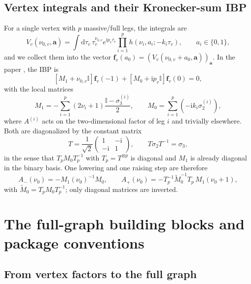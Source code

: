 \documentclass[11pt,a4paper]{article}
\newcommand{\dd}{\mathrm d}
\newcommand{\ii}{\mathrm i}
\newcommand{\Id}{\mathbb I}
\begin{document}
\subsection{Vertex integrals and their Kronecker-sum IBP}

For a single vertex with $p$ massive/full legs, the integrals are
\begin{equation}
  V_v(\nu_{0,v},\bm a)
  =\int\dd\tau_v\,\tau_v^{\nu_{0,v}}e^{\ii p_v\tau_v}
  \prod_{i=1}^{p}h(\nu_i,a_i;-k_i\tau_v),
  \qquad a_i\in\{0,1\},
\end{equation}
and we collect them into the vector $\bm f_v(a_0)=(V_v(\nu_{0,v}+a_0,\bm a))_{\bm a}$. In the paper
\citet{Chen:2023eic}, the IBP is
\begin{equation}
  \left[M_1+\nu_{0,v}\Id\right]\bm f_v(-1)
  +\left[M_0+\ii p_v\Id\right]\bm f_v(0)=0,
  \label{eq:vertex-ibp}
\end{equation}
with the local matrices
\begin{equation}
  M_1=-\sum_{i=1}^{p}(2\nu_i+1)\frac{\Id-\sigma_3^{(i)}}{2},
  \qquad
  M_0=\sum_{i=1}^{p}(-\ii k_i\sigma_2^{(i)}),
  \label{eq:vertex-M1-M0}
\end{equation}
where $A^{(i)}$ acts on the two-dimensional factor of leg $i$ and trivially elsewhere. Both are
diagonalized by the constant matrix
\begin{equation}
  T=\frac1{\sqrt2}
  \begin{pmatrix}1&-\ii\\-\ii&1\end{pmatrix},
  \qquad
  T\sigma_2T^{-1}=\sigma_3,
  \label{eq:paper-T}
\end{equation}
in the sense that $T_pM_0T_p^{-1}$ with $T_p=T^{\otimes p}$ is diagonal and $M_1$ is already diagonal
in the binary basis. One lowering and one raising step are therefore
\begin{equation}
  A_{-}(\nu_0)=-M_1(\nu_0)^{-1}M_0,
  \qquad
  A_{+}(\nu_0)=-T_p^{-1}\widetilde M_0^{-1}T_p\,M_1(\nu_0+1),
  \label{eq:vertex-Apm}
\end{equation}
with $\widetilde M_0=T_pM_0T_p^{-1}$; only diagonal matrices are inverted.

\section{The full-graph building blocks and package conventions}
\label{sec:full-graph}

\subsection{From vertex factors to the full graph}
\end{document}
